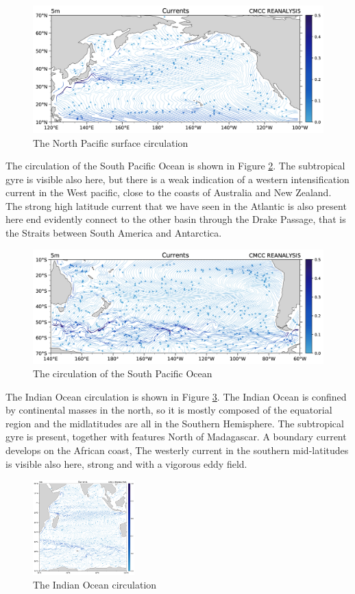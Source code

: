 \begin{figure}[htpb]
	\centering
	\includegraphics[width = 0.4 \textwidth]{upload/i36mage.png}
	\caption{The North Pacific surface circulation} \label{fig:fig11}
\end{figure}

The circulation of the South Pacific Ocean is shown in Figure \ref{fig:fig12}. The subtropical gyre is visible also here, but there is a weak indication of a western intensification current in the West pacific, close to the coasts of Australia and New Zealand. The strong high latitude current that we have seen in the Atlantic is also present here end evidently connect to the other basin through the Drake Passage, that is the Straits between South America and Antarctica.

\begin{figure}[htpb]
	\centering
	\includegraphics[width = 0.5 \textwidth]{upload/37image.png}
	\caption{The circulation of the South Pacific Ocean} \label{fig:fig12}
\end{figure}

The Indian Ocean circulation is shown in Figure \ref{fig:fig13}. The Indian Ocean is confined by continental masses in the north, so it is mostly composed of the equatorial region and the midlatitudes are all in the Southern Hemisphere. The subtropical gyre is present, together with features North of Madagascar. A boundary current develops on the African coast, The westerly current in the southern mid-latitudes is visible also here, strong and with a vigorous eddy field.

\begin{figure}[htpb]
	\centering
	\includegraphics[width = 0.35\textwidth]{upload/38image.png}
	\caption{The Indian Ocean circulation} \label{fig:fig13}
\end{figure}

